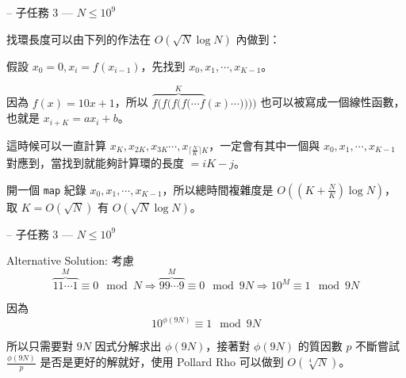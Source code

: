 \documentclass[hyperref,UTF8,notheorems,xcolor={dvipsnames}]{beamer}
\newcommand{\btitle}[1]{{\secname} -- #1}
\theoremstyle{definition}
\begin{document}
\begin{frame}[fragile]{\btitle{子任務 3 --- $N \leq 10^9$}}
	
	找環長度可以由下列的作法在 $O(\sqrt N \log N)$ 內做到：  

	假設 $x_0 = 0, x_i = f(x_{i-1})$，先找到 $x_0, x_1, \cdots, x_{K-1}$。  

	因為 $f(x) = 10 x + 1$，所以 $\overset{K}{\overbrace{f(f(f(f(\cdots f}}(x) \cdots))))$ 也可以被寫成一個線性函數，也就是 $x_{i+K} = a x_i + b$。

	這時候可以一直計算 $x_{K}, x_{2K}, x_{3K} \cdots, x_{\lceil\frac N K\rceil K}$，一定會有其中一個與 $x_0, x_1, \cdots, x_{K-1}$ 對應到，當找到就能夠計算環的長度 $= iK - j$。  

	開一個 \texttt{map} 紀錄 $x_0, x_1, \cdots, x_{K-1}$，所以總時間複雜度是 $O((K + \frac N K)\log N)$，取 $K = O(\sqrt N)$ 有 $O(\sqrt N \log N)$。   

\end{frame}

\begin{frame}[fragile]{\btitle{子任務 3 --- $N \leq 10^9$}}
	
	Alternative Solution: 考慮
	\[ \overset{M}{\overbrace{11\cdots1}} \equiv 0 \mod N \Rightarrow \overset{M}{\overbrace{99\cdots9}} \equiv 0 \mod 9N \Rightarrow 10^M \equiv 1 \mod 9N \]

	因為 
	\[ 10^{\phi(9N)} \equiv 1 \mod 9N \]

	所以只需要對 $9N$ 因式分解求出 $\phi(9N)$，接著對 $\phi(9N)$ 的質因數 $p$ 不斷嘗試 $\frac{\phi(9N)}{p}$ 是否是更好的解就好，使用 Pollard Rho 可以做到 $O(\sqrt[4]N)$。  
	
\end{frame}
\end{document}
